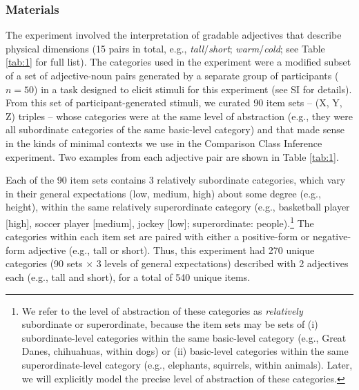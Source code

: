 \documentclass[doc, floatsintext]{apa6}
\begin{document}
\subsubsection{Materials}

The experiment involved the interpretation of gradable adjectives that describe physical dimensions (15 pairs in total, e.g., \emph{tall}/\emph{short}; \emph{warm}/\emph{cold}; see Table \ref{tab:1} for full list).
The categories used in the experiment were a modified subset of a set of adjective-noun pairs generated by a separate group of participants ($n=50$) in a task designed to elicit stimuli for this experiment (see SI for details).
From this set of participant-generated stimuli, we curated 90 item sets -- (X, Y, Z)  triples -- whose categories were at the same level of abstraction  (e.g., they were all subordinate categories of the same basic-level category) and that made sense in the kinds of minimal contexts we use in the Comparison Class Inference experiment.
Two examples from each adjective pair are shown in Table \ref{tab:1}.

Each of the 90 item sets contains 3 relatively subordinate categories, which vary in their general expectations (low, medium, high) about some degree (e.g., height), within the same relatively superordinate category (e.g., basketball player [high], soccer player [medium], jockey [low]; superordinate: people).\footnote{
We refer to the level of abstraction of these categories as \emph{relatively} subordinate or superordinate, because the item sets may be sets of (i) subordinate-level categories within the same basic-level category (e.g., Great Danes, chihuahuas, within dogs) or (ii) basic-level categories within the same superordinate-level category (e.g., elephants, squirrels, within animals). Later, we will explicitly model the precise level of abstraction of these categories.
}
The categories within each item set are paired with either a positive-form or negative-form adjective (e.g., tall or short).
Thus, this experiment had 270 unique categories (90 sets $\times$ 3 levels of general expectations) described with 2 adjectives each (e.g., tall and short), for a total of 540 unique items.
\end{document}
